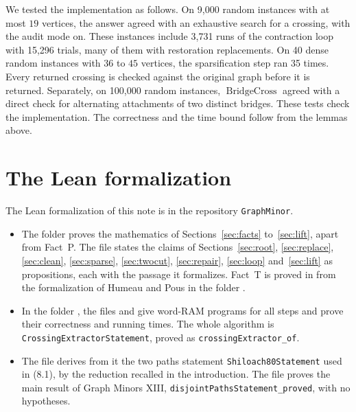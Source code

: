 \documentclass[11pt]{article}
\DeclareMathOperator{\BridgeCross}{BridgeCross}
\begin{document}
We tested the implementation as follows. On 9{,}000 random instances with at
most $19$ vertices, the answer agreed with an exhaustive search for a crossing,
with the audit mode on. These instances include 3{,}731 runs of the
contraction loop with 15{,}296 trials, many of them with restoration
replacements. On 40 dense random instances with $36$ to $45$ vertices, the
sparsification step ran 35 times. Every returned crossing is checked against
the original graph before it is returned. Separately, on 100{,}000 random
instances, $\BridgeCross$ agreed with a direct check for alternating
attachments of two distinct bridges. These tests check the implementation. The
correctness and the time bound follow from the lemmas above.

\section{The Lean formalization}\label{sec:lean}

The Lean formalization of this note is in the repository \texttt{GraphMinor}.
\begin{itemize}[nosep]
\item The folder  proves the mathematics of
Sections~\ref{sec:facts} to~\ref{sec:lift}, apart from Fact~P. The file
 states the claims of
Sections~\ref{sec:root}, \ref{sec:replace}, \ref{sec:clean}, \ref{sec:sparse},
\ref{sec:twocut}, \ref{sec:repair}, \ref{sec:loop} and~\ref{sec:lift} as
propositions, each with the passage it formalizes. Fact~T is proved in
 from the formalization of
Humeau and Pous in the folder .
\item In the folder , the files
 and  give word-RAM programs
for all steps and prove their correctness and running times. The whole
algorithm is \texttt{CrossingExtractorStatement}, proved as
\texttt{crossingExtractor\_of}.
\item The file 
derives from it the two paths statement \texttt{Shiloach80Statement} used in
(8.1), by the reduction recalled in the introduction. The file
 proves the main result of
Graph Minors XIII, \texttt{disjointPathsStatement\_proved}, with no hypotheses.
\end{itemize}
\end{document}
